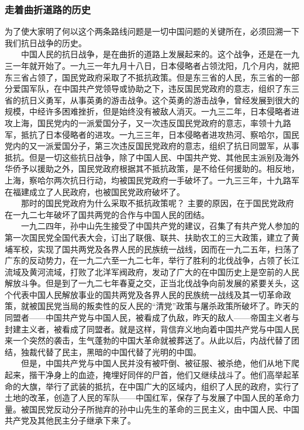 \documentclass[cn,11pt,chinese]{elegantbook}
\def\myformat#1{\hfil\hfil #1}
\begin{document}
\subsubsection*{\myformat{走着曲折道路的历史}}
为了使大家明了何以这个两条路线问题是一切中国问题的关键所在，必须回溯一下我们抗日战争的历史。\\
　　中国人民的抗日战争，是在曲折的道路上发展起来的。这个战争，还是在一九三一年就开始了。一九三一年九月十八日，日本侵略者占领沈阳，几个月内，就把东三省占领了，国民党政府采取了不抵抗政策。但是东三省的人民，东三省的一部分爱国军队，在中国共产党领导或协助之下，违反国民党政府的意志，组织了东三省的抗日义勇军，从事英勇的游击战争。这个英勇的游击战争，曾经发展到很大的规模，中经许多困难挫折，但是始终没有被敌人消灭。一九三二年，日本侵略者进攻上海，国民党内的一派爱国分子，又一次违反国民党政府的意志，率领十九路军，抵抗了日本侵略者的进攻。一九三三年，日本侵略者进攻热河、察哈尔，国民党内的又一派爱国分子，第三次违反国民党政府的意志，组织了抗日同盟军，从事抵抗。但是一切这些抗日战争，除了中国人民、中国共产党、其他民主派别及海外华侨予以援助之外，国民党政府根据其不抵抗政策，是不给任何援助的。相反地，上海，察哈尔两次抗日行动，均被国民党政府一手破坏了。一九三三年，十九路军在福建成立了人民政府，也被国民党政府破坏了。\\
　　那时的国民党政府为什么采取不抵抗政策呢？ 主要的原因，在于国民党政府在一九二七年破坏了国共两党的合作与中国人民的团结。\\
　　一九二四年，孙中山先生接受了中国共产党的建议，召集了有共产党人参加的第一次国民党全国代表大会，订出了联俄、联共、扶助农工的三大政策，建立了黄埔军校，实现了国共两党及各界人民的民族统一战线，因而在一九二五年，扫荡了广东的反动势力，在一九二六至一九二七年，举行了胜利的北伐战争，占领了长江流域及黄河流域，打败了北洋军阀政府，发动了广大的在中国历史上是空前的人民解放斗争。但是到了一九二七年春夏之交，正当北伐战争向前发展的紧要关头，这个代表中国人民解放事业的国共两党及各界人民的民族统一战线及其一切革命政策，就被国民党当局的叛卖性的反人民的“清党”政策与屠杀政策所破坏了。昨天的同盟者——中国共产党与中国人民，被看成了仇敌，昨天的敌人——帝国主义者与封建主义者，被看成了同盟者。就是这样，背信弃义地向着中国共产党与中国人民来一个突然的袭击，生气蓬勃的中国大革命就被葬送了。从此以后，内战代替了团结，独裁代替了民主，黑暗的中国代替了光明的中国。\\
　　但是，中国共产党与中国人民并没有被吓倒、被征服、被杀绝，他们从地下爬起来，揩干净身上的血迹，掩埋好同伴的尸首，他们又继续战斗了。他们高举起革命的大旗，举行了武装的抵抗，在中国广大的区域内，组织了人民的政府，实行了土地的改革，创造了人民的军队——中国红军，保存了与发展了中国人民的革命力量。被国民党反动分子所抛弃的孙中山先生的革命的三民主义，由中国人民、中国共产党及其他民主分子继承下来了。\\
\end{document}
